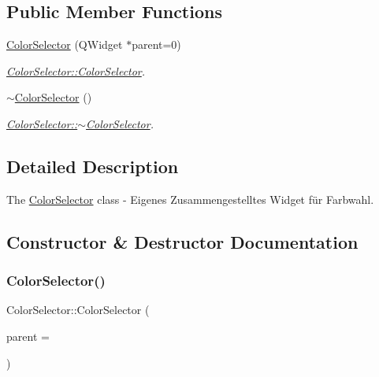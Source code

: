 \subsection*{Public Member Functions}
\begin{DoxyCompactItemize}
\item 
\hyperlink{class_color_selector_aa8669eb9e5da7ca151ef84fba84a5f34}{Color\+Selector} (Q\+Widget $\ast$parent=0)
\begin{DoxyCompactList}\small\item\em \hyperlink{class_color_selector_aa8669eb9e5da7ca151ef84fba84a5f34}{Color\+Selector\+::\+Color\+Selector}. \end{DoxyCompactList}\item 
\hyperlink{class_color_selector_a8c5de1d7bf1515c11ba0157e2b11aff4}{$\sim$\+Color\+Selector} ()
\begin{DoxyCompactList}\small\item\em \hyperlink{class_color_selector_a8c5de1d7bf1515c11ba0157e2b11aff4}{Color\+Selector\+::$\sim$\+Color\+Selector}. \end{DoxyCompactList}\end{DoxyCompactItemize}


\subsection{Detailed Description}
The \hyperlink{class_color_selector}{Color\+Selector} class -\/ Eigenes Zusammengestelltes Widget für Farbwahl. 

\subsection{Constructor \& Destructor Documentation}
\mbox{\label{class_color_selector_aa8669eb9e5da7ca151ef84fba84a5f34}} 
\subsubsection{\texorpdfstring{Color\+Selector()}{ColorSelector()}}
{\footnotesize\ttfamily Color\+Selector\+::\+Color\+Selector (\begin{DoxyParamCaption}\item[{Q\+Widget $\ast$}]{parent = {} }\end{DoxyParamCaption})\hspace{0.3cm}{\ttfamily [explicit]}}



